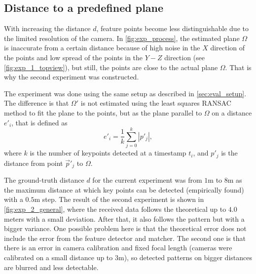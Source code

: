 \subsection{Distance to a predefined plane}
\label{sec:exp2}
With increasing the distance $d$, feature points become less distinguishable due to the limited resolution of the camera.
In \autoref{fig:exp_process}, the estimated plane $\Omega$ is inaccurate from a certain distance because of high noise in the $X$ direction of the points and low spread of the points in the $Y-Z$ direction (see \autoref{fig:exp_1_topview}), but still, the points are close to the actual plane $\Omega$.
That is why the second experiment was constructed.

The experiment was done using the same setup as described in \autoref{sec:eval_setup}. 
The difference is that $\Omega'$ is not estimated using the least squares RANSAC method to fit the plane to the points, but as the plane parallel to $\Omega$ on a distance $e'_i$, that is defined as
\begin{equation}    
    e'_i = \frac{1}{k} \sum_{j=0}^{k}{|p'_j|},
\end{equation}
where $k$ is the number of keypoints detected at a timestamp $t_i$, and $p'_j$ is the distance from point $\vec{p}'_j$ to $\Omega$.


The ground-truth distance $d$ for the current experiment was from $1$m to $8$m as the maximum distance at which key points can be detected (empirically found) with a $0.5$m step.
The result of the second experiment is shown in \autoref{fig:exp_2_general}, where the received data follows the theoretical up to $4.0$ meters with a small deviation. 
After that, it also follows the pattern but with a bigger variance.
One possible problem here is that the theoretical error does not include the error from the feature detector and matcher.
The second one is that there is an error in camera calibration and fixed focal length (cameras were calibrated on a small distance up to $3$m), so detected patterns on bigger distances are blurred and less detectable. 

